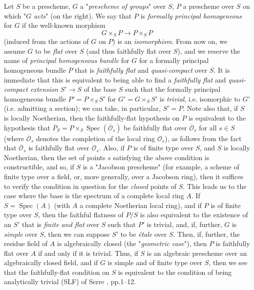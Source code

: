 Let $S$ be a prescheme, $G$ a "\emph{prescheme of groups}" over $S$, $P$ a prescheme over $S$ on which "\emph{$G$ acts}" (on the right).
We say that $P$ is \emph{formally principal homogeneous} for $G$ if the well-known morphism
\[
    G\times_S P \to P\times_S P
\]
(induced from the actions of $G$ on $P$) is an \emph{isomorphism}.
From now on, we assume $G$ to be \emph{flat} over $S$ (and thus faithfully flat over $S$), and we reserve the name of \emph{principal homogeneous bundle} for $G$ for a formally principal homogeneous bundle $P$ that is \emph{faithfully flat} and \emph{quasi-compact} over $S$.
It is immediate that this is equivalent to being able to find a \emph{faithfully flat} and \emph{quasi-compact extension} $S'\to S$ of the base $S$ such that the formally principal homogeneous bundle $P'=P\times_S S'$ for $G'=G\times_S S'$ is \emph{trivial}, i.e. isomorphic to $G'$ (i.e. admitting a section);
we can take, in particular, $S'=P$.
Note also that, if $S$ is locally Noetherian, then the faithfully-flat hypothesis on $P$ is equivalent to the hypothesis that $\overline{P}_S=P\times_S\operatorname{Spec}(\overline{\mathcal{O}}_s)$ be faithfully flat over $\overline{\mathcal{O}}_s$ for all $s\in S$ (where $\overline{\mathcal{O}}_s$ denotes the completion of the local ring $\mathcal{O}_s$), as follows from the fact that $\overline{\mathcal{O}}_s$ is faithfully flat over $\mathcal{O}_s$.
Also, if $P$ is of finite type over $S$, and $S$ is locally Noetherian, then the set of points $s$ satisfying the above condition is constructible, and so, if $S$ is a "Jacobson prescheme" (for example, a scheme of finite type over a field, or, more generally, over a Jacobson ring), then it suffices to verify the condition in question for the \emph{closed} points of $S$.
This leads us to the case where the base is the spectrum of a complete local ring $A$.
If $S=\operatorname{Spec}(A)$ (with $A$ a complete Noetherian local ring), and if $P$ is of finite type over $S$, then the faithful flatness of $P/S$ is also equivalent to the existence of an $S'$ that is \emph{finite and flat} over $S$ such that $P'$ is trivial, and, if, further, $G$ is \emph{simple} over $S$, then we can suppose $S'$ to be \emph{étale} over $S$.
Then, if, further, the residue field of $A$ is algebraically closed (the "\emph{geometric case}"), then $P$ is faithfully flat over $A$ if and only if it is trivial.
Thus, if $S$ is an algebraic prescheme over an algebraically closed field, and if $G$ is simple and of finite type over $S$, then we see that the faithfully-flat condition on $S$ is equivalent to the condition of being analytically trivial (SLF) of Serre \cite{Ser1958a}, pp.1–12.


